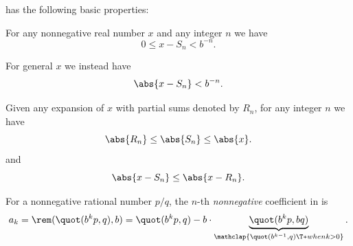 \begin{proposition}\label{thm:alg:real_number_radix_expansion}
   has the following basic properties:
  \begin{thmenum}
     For any nonnegative real number \( x \) and any integer \( n \) we have
    \begin{equation}\label{eq:thm:alg:real_number_radix_expansion/estimate/nonnegative}
      0 \leq x - S_n < b^{-n}.
    \end{equation}

    For general \( x \) we instead have
    \begin{equation}\label{eq:thm:alg:real_number_radix_expansion/estimate/general}
      \abs{x - S_n} < b^{-n}.
    \end{equation}

     Given any expansion of \( x \) with partial sums denoted by \( R_n \), for any integer \( n \) we have
    \begin{equation}\label{eq:thm:alg:real_number_radix_expansion/optimal/max}
      \abs{R_n} \leq \abs{S_n} \leq \abs{x}.
    \end{equation}
    and
    \begin{equation}\label{eq:thm:alg:real_number_radix_expansion/optimal/min}
      \abs{x - S_n} \leq \abs{x - R_n}.
    \end{equation}

     For a nonnegative rational number \( p / q \), the \( n \)-th \emph{nonnegative} coefficient in  is
    \begin{equation}\label{eq:thm:alg:real_number_radix_expansion/rational_coefficient}
      a_k
      =
      \rem(\quot(b^k p, q), b)
      =
      \quot(b^k p, q) - b \cdot \underbrace{\quot(b^k p, bq)}_{\mathclap{\quot(b^{k-1}, q) \T*{when} k > 0}}.
    \end{equation}
  \end{thmenum}
\end{proposition}

